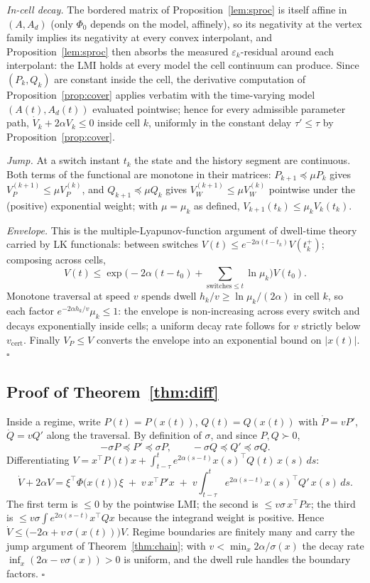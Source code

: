 \documentclass[preprint,12pt]{elsarticle}
\newcommand{\vcert}{v_{\mathrm{cert}}}
\begin{document}
\emph{In-cell decay.}  The bordered matrix of
Proposition~\ref{lem:sproc} is itself affine in $(A, A_d)$ (only
$\Phi_0$ depends on the model, affinely), so its negativity at the
vertex family implies its negativity at every convex interpolant, and
Proposition~\ref{lem:sproc} then absorbs the measured
$\varepsilon_k$-residual around each interpolant: the LMI holds at
every model the cell continuum can produce.  Since $(P_k, Q_k)$ are
constant inside the cell, the derivative computation of
Proposition~\ref{prop:cover} applies verbatim with the time-varying
model $(A(t), A_d(t))$ evaluated pointwise; hence for every
admissible parameter path, $\dot V_k + 2\alpha V_k \le 0$ inside cell
$k$, uniformly in the constant delay $\tau' \le \tau$ by
Proposition~\ref{prop:cover}.

\emph{Jump.}  At a switch instant $t_k$ the state and the history
segment are continuous.  Both terms of the functional are monotone in
their matrices: $P_{k+1} \preceq \mu P_k$ gives
$V_P^{(k+1)} \le \mu V_P^{(k)}$, and $Q_{k+1} \preceq \mu Q_k$ gives
$V_W^{(k+1)} \le \mu V_W^{(k)}$ pointwise under the (positive)
exponential weight; with
$\mu = \mu_k$ as defined,
$V_{k+1}(t_k) \le \mu_k V_k(t_k)$.

\emph{Envelope.}  This is the multiple-Lyapunov-function argument of
dwell-time theory \cite{Hespanha1999} carried by LK functionals:
between switches
$V(t) \le e^{-2\alpha (t - t_k)} V(t_k^{+})$; composing across cells,
\[
V(t) \le \exp\Big(-2\alpha(t - t_0) +
\sum_{\text{switches} \le t} \ln \mu_k\Big) V(t_0).
\]
Monotone traversal at speed $v$ spends dwell $h_k / v \ge
\ln\mu_k / (2\alpha)$ in cell $k$, so each factor
$e^{-2\alpha h_k / v} \mu_k \le 1$: the envelope is non-increasing
across every switch and decays exponentially inside cells; a uniform
decay rate follows for $v$ strictly below $\vcert$.  Finally
$V_P \le V$ converts the envelope into an exponential bound on
$|x(t)|$. \hfill$\square$

\subsection{Proof of Theorem~\ref{thm:diff}}

Inside a regime, write $P(t) = P(x(t))$, $Q(t) = Q(x(t))$ with
$\dot P = v P'$, $\dot Q = v Q'$ along the traversal.  By definition
of $\sigma$, and since $P, Q \succ 0$,
\[
-\sigma P \preceq P' \preceq \sigma P,
\qquad
-\sigma Q \preceq Q' \preceq \sigma Q .
\]
Differentiating $V = x^{\!\top} P(t) x + \int_{t-\tau}^{t}
e^{2\alpha(s-t)} x(s)^{\!\top} Q(t)\, x(s)\, ds$:
\[
\dot V + 2\alpha V
= \xi^{\!\top} \Phi\big(x(t)\big)\, \xi
\;+\; v\, x^{\!\top} P' x
\;+\; v \int_{t-\tau}^{t} e^{2\alpha(s-t)} x(s)^{\!\top} Q'\,
x(s)\, ds .
\]
The first term is $\le 0$ by the pointwise LMI; the second is
$\le v \sigma\, x^{\!\top} P x$; the third is
$\le v \sigma \int e^{2\alpha(s-t)} x^{\!\top} Q x$ because the
integrand weight is positive.  Hence
$\dot V \le \big({-2\alpha} + v\,\sigma(x(t))\big) V$.  Regime
boundaries are finitely many and carry the jump argument of
Theorem~\ref{thm:chain}; with $v < \min_x 2\alpha / \sigma(x)$ the
decay rate $\inf_x (2\alpha - v\sigma(x)) > 0$ is uniform, and the
dwell rule handles the boundary factors. \hfill$\square$
\end{document}
